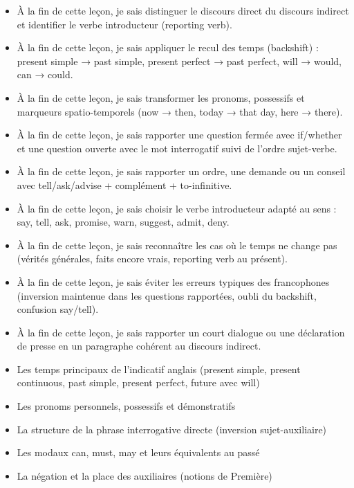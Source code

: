 \documentclass[11pt]{article}
\begin{document}
\begin{objectifs}
\begin{itemize}
\item À la fin de cette leçon, je sais distinguer le discours direct du discours indirect et identifier le verbe introducteur (reporting verb).
\item À la fin de cette leçon, je sais appliquer le recul des temps (backshift) : present simple → past simple, present perfect → past perfect, will → would, can → could.
\item À la fin de cette leçon, je sais transformer les pronoms, possessifs et marqueurs spatio-temporels (now → then, today → that day, here → there).
\item À la fin de cette leçon, je sais rapporter une question fermée avec if/whether et une question ouverte avec le mot interrogatif suivi de l'ordre sujet-verbe.
\item À la fin de cette leçon, je sais rapporter un ordre, une demande ou un conseil avec tell/ask/advise + complément + to-infinitive.
\item À la fin de cette leçon, je sais choisir le verbe introducteur adapté au sens : say, tell, ask, promise, warn, suggest, admit, deny.
\item À la fin de cette leçon, je sais reconnaître les cas où le temps ne change pas (vérités générales, faits encore vrais, reporting verb au présent).
\item À la fin de cette leçon, je sais éviter les erreurs typiques des francophones (inversion maintenue dans les questions rapportées, oubli du backshift, confusion say/tell).
\item À la fin de cette leçon, je sais rapporter un court dialogue ou une déclaration de presse en un paragraphe cohérent au discours indirect.
\end{itemize}
\end{objectifs}

\begin{prerequis}
\begin{itemize}
\item Les temps principaux de l'indicatif anglais (present simple, present continuous, past simple, present perfect, future avec will)
\item Les pronoms personnels, possessifs et démonstratifs
\item La structure de la phrase interrogative directe (inversion sujet-auxiliaire)
\item Les modaux can, must, may et leurs équivalents au passé
\item La négation et la place des auxiliaires (notions de Première)
\end{itemize}
\end{prerequis}
\end{document}
